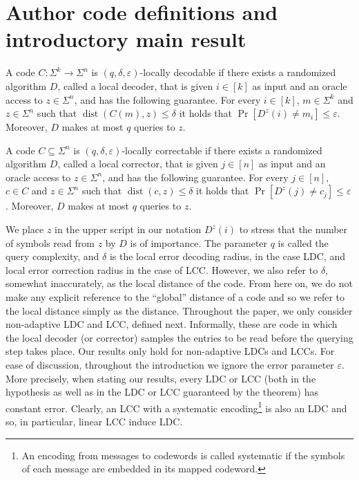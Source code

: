 \section*{Author code definitions and introductory main result}
\setcounter{nttheorem}{0}
\begin{ntdefinition}
A code $C:\Sigma^k\to\Sigma^n$ is $(q,\delta,\varepsilon)$-locally decodable if there exists a randomized algorithm $D$, called a local decoder, that is given $i\in[k]$ as input and an oracle access to $z\in\Sigma^n$, and has the following guarantee. For every $i\in[k]$, $m\in\Sigma^k$ and $z\in\Sigma^n$ such that $\operatorname{dist}(C(m),z)\leq\delta$ it holds that $\Pr[D^z(i)\ne m_i]\leq\varepsilon$. Moreover, $D$ makes at most $q$ queries to $z$.
\end{ntdefinition}
\begin{ntdefinition}
A code $C\subseteq\Sigma^n$ is $(q,\delta,\varepsilon)$-locally correctable if there exists a randomized algorithm $D$, called a local corrector, that is given $j\in[n]$ as input and an oracle access to $z\in\Sigma^n$, and has the following guarantee. For every $j\in[n]$, $c\in C$ and $z\in\Sigma^n$ such that $\operatorname{dist}(c,z)\leq\delta$ it holds that $\Pr[D^z(j)\ne c_j]\leq\varepsilon$. Moreover, $D$ makes at most $q$ queries to $z$.
\end{ntdefinition}
We place $z$ in the upper script in our notation $D^z(i)$ to stress that the number of symbols read from $z$ by $D$ is of importance. The parameter $q$ is called the query complexity, and $\delta$ is the local error decoding radius, in the case LDC, and local error correction radius in the case of LCC. However, we also refer to $\delta$, somewhat inaccurately, as the local distance of the code. From here on, we do not make any explicit reference to the ``global'' distance of a code and so we refer to the local distance simply as the distance. Throughout the paper, we only consider non-adaptive LDC and LCC, defined next. Informally, these are code in which the local decoder (or corrector) samples the entries to be read before the querying step takes place. Our results only hold for non-adaptive LDCs and LCCs. For ease of discussion, throughout the introduction we ignore the error parameter $\varepsilon$. More precisely, when stating our results, every LDC or LCC (both in the hypothesis as well as in the LDC or LCC guaranteed by the theorem) has constant error.
Clearly, an LCC with a systematic encoding\footnote{An encoding from messages to codewords is called systematic if the symbols of each message are embedded in its mapped codeword.} is also an LDC and so, in particular, linear LCC induce LDC.
